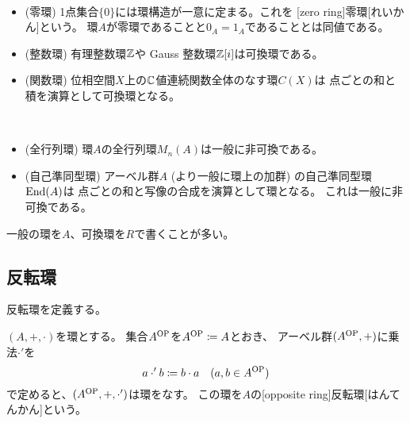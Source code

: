 \documentclass[report]{jlreq}
\begin{document}
\begin{example}[可換環の例]
    ~
    \begin{itemize}
        \item (零環) 1点集合$\{0\}$には環構造が一意に定まる。これを
            [zero ring]{零環}[れいかん]という。
            環$A$が零環であることと$0_A = 1_A$であることとは同値である。
        \item (整数環) 有理整数環$\mathbb{Z}$や Gauss 整数環$\mathbb{Z}[i]$は可換環である。
        \item (関数環) 位相空間$X$上の$\mathbb{C}$値連続関数全体のなす環$C(X)$は
            点ごとの和と積を演算として可換環となる。
    \end{itemize}
\end{example}

\begin{example}[非可換環の例]
    ~
    \begin{itemize}
        \item (全行列環) 環$A$の全行列環$M_n(A)$は一般に非可換である。
        \item (自己準同型環) アーベル群$A$ (より一般に環上の加群) の自己準同型環$\operatorname{End}(A)$は
            点ごとの和と写像の合成を演算として環となる。
            これは一般に非可換である。
    \end{itemize}
\end{example}

\begin{remark}
    一般の環を$A$、可換環を$R$で書くことが多い。
\end{remark}

\begin{example}[測度論との関連]
\end{example}

\subsection{反転環}

反転環を定義する。

\begin{definition}[反転環]
    $(A, +, \cdot)$を環とする。
    集合$A^{\mathrm{OP}}$を$A^{\mathrm{OP}} \coloneqq A$とおき、
    アーベル群$(A^{\mathrm{OP}}, +)$に乗法$\cdot'$を
    \begin{equation}
        a \cdot' b \coloneqq b \cdot a
        \quad (a, b \in A^{\mathrm{OP}})
    \end{equation}
    で定めると、$(A^{\mathrm{OP}}, +, \cdot')$は環をなす。
    この環を$A$の[opposite ring]{反転環}[はんてんかん]という。
\end{definition}
\end{document}
